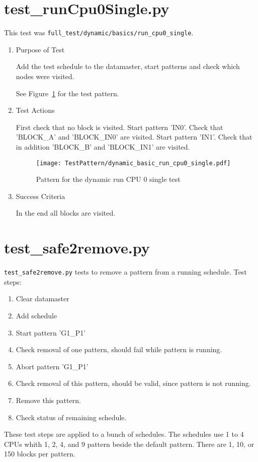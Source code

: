 \documentclass[12pt,a4paper]{report}
\begin{document}
\section{test\_runCpu0Single.py}
This test was \texttt{full\_test/dynamic/basics/run\_cpu0\_single}.
\begin{enumerate}
  \item Purpose of Test

    Add the test schedule to the datamaster, start patterns and check
    which nodes were visited.

  See Figure~\ref{fig:Pattern_for_the_dynamic_run_CPU_0_single_test}
  for the test pattern.
  \item Test Actions

    First check that no block is visited. Start pattern 'IN0'. Check
    that 'BLOCK\_A' and 'BLOCK\_IN0' are visited.
    Start pattern 'IN1'. Check that in addition 'BLOCK\_B' and
    'BLOCK\_IN1' are visited.
    \begin{figure}
        \centering
        \texttt{[image: TestPattern/dynamic\_basic\_run\_cpu0\_single.pdf]}
        \caption{Pattern for the dynamic run CPU 0 single test}
        \label{fig:Pattern_for_the_dynamic_run_CPU_0_single_test}
    \end{figure}
  \item Success Criteria

  In the end all blocks are visited.
\end{enumerate}

\section{test\_safe2remove.py}
\texttt{test\_safe2remove.py} tests to remove a pattern from a running schedule. Test steps:
\begin{enumerate}
\item Clear datamaster
\item Add schedule
\item Start pattern 'G1\_P1'
\item Check removal of one pattern, should fail while pattern is running.
\item Abort pattern 'G1\_P1'
\item Check removal of this pattern, should be valid, since pattern is not running.
\item Remove this pattern.
\item Check status of remaining schedule.
\end{enumerate}
These test steps are applied to a bunch of schedules.
The schedules use 1 to 4 CPUs whith 1, 2, 4, and 9 pattern beside the default pattern. There are 1, 10, or 150 blocks per pattern.
\end{document}
